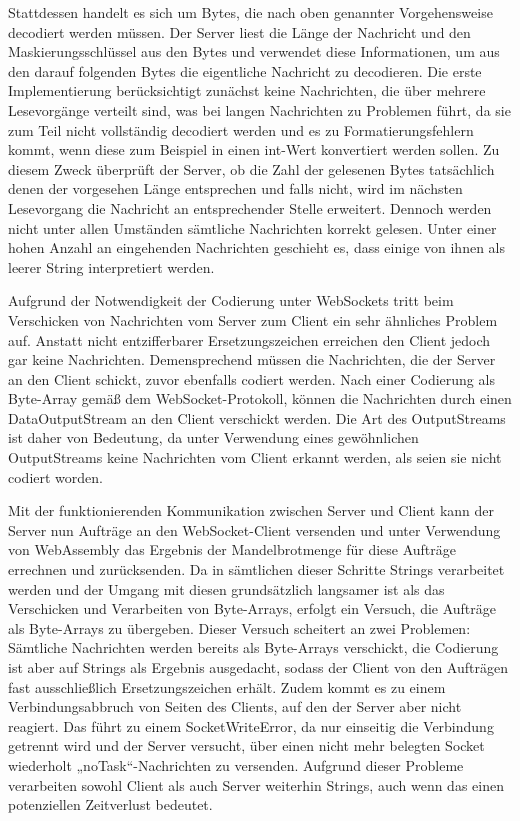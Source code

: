 \documentclass[12pt, onecolumn,notitlepage]{scrartcl}
\begin{document}
Stattdessen handelt es sich um Bytes, die nach oben genannter Vorgehensweise decodiert werden müssen. Der Server liest die Länge der Nachricht und den Maskierungsschlüssel aus den Bytes und verwendet diese Informationen, um aus den darauf folgenden Bytes die eigentliche Nachricht zu decodieren. Die erste Implementierung berücksichtigt zunächst keine Nachrichten, die über mehrere Lesevorgänge verteilt sind, was bei langen Nachrichten zu Problemen führt, da sie zum Teil nicht vollständig decodiert werden und es zu Formatierungsfehlern kommt, wenn diese zum Beispiel in einen int-Wert konvertiert werden sollen. Zu diesem Zweck überprüft der Server, ob die Zahl der gelesenen Bytes tatsächlich denen der vorgesehen Länge entsprechen und falls nicht, wird im nächsten Lesevorgang die Nachricht an entsprechender Stelle erweitert. Dennoch werden nicht unter allen Umständen sämtliche Nachrichten korrekt gelesen. Unter einer hohen Anzahl an eingehenden Nachrichten geschieht es, dass einige von ihnen als leerer String interpretiert werden. \par

Aufgrund der Notwendigkeit der Codierung unter WebSockets tritt beim Verschicken von Nachrichten vom Server zum Client ein sehr ähnliches Problem auf. Anstatt nicht entzifferbarer Ersetzungszeichen erreichen den Client jedoch gar keine Nachrichten. Demensprechend müssen die Nachrichten, die der Server an den Client schickt, zuvor ebenfalls codiert werden. Nach einer Codierung als Byte-Array gemäß dem WebSocket-Protokoll, können die Nachrichten durch einen DataOutputStream an den Client verschickt werden. Die Art des OutputStreams ist daher von Bedeutung, da unter Verwendung eines gewöhnlichen OutputStreams keine Nachrichten vom Client erkannt werden, als seien sie nicht codiert worden. \par

Mit der funktionierenden Kommunikation zwischen Server und Client kann der Server nun Aufträge an den WebSocket-Client versenden und unter Verwendung von WebAssembly das Ergebnis der Mandelbrotmenge für diese Aufträge errechnen und zurücksenden. Da in sämtlichen dieser Schritte Strings verarbeitet werden und der Umgang mit diesen grundsätzlich langsamer ist als das Verschicken und Verarbeiten von Byte-Arrays, erfolgt ein Versuch, die Aufträge als Byte-Arrays zu übergeben. Dieser Versuch scheitert an zwei Problemen: Sämtliche Nachrichten werden bereits als Byte-Arrays verschickt, die Codierung ist aber auf Strings als Ergebnis ausgedacht, sodass der Client von den Aufträgen fast ausschließlich Ersetzungszeichen erhält. Zudem kommt es zu einem Verbindungsabbruch von Seiten des Clients, auf den der Server aber nicht reagiert. Das führt zu einem SocketWriteError, da nur einseitig die Verbindung getrennt wird und der Server versucht, über einen nicht mehr belegten Socket wiederholt „noTask“-Nachrichten zu versenden. Aufgrund dieser Probleme verarbeiten sowohl Client als auch Server weiterhin Strings, auch wenn das einen potenziellen Zeitverlust bedeutet. \par
\end{document}
